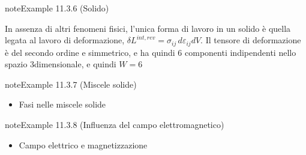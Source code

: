\documentclass[letterpaper,10pt,italian]{jupyterBook}
\begin{document}
\label{ch/thermodynamics/principles-gibbs-phase-rule:example-8}
\begin{sphinxadmonition}{note}{Example 11.3.6 (Solido)}



\sphinxAtStartPar
In assenza di altri fenomeni fisici, l’unica forma di lavoro in un solido è quella legata al lavoro di deformazione, \(\delta L^{int,rev} = \sigma_{ij} \, d \varepsilon_{ij} dV\). Il tensore di deformazione è del secondo ordine e simmetrico, e ha quindi 6 componenti indipendenti nello spazio 3\sphinxhyphen{}dimensionale, e quindi \(W=6\)
\end{sphinxadmonition}
\label{ch/thermodynamics/principles-gibbs-phase-rule:example-9}
\begin{sphinxadmonition}{note}{Example 11.3.7 (Miscele solide)}


\begin{itemize}
\item {} 
\sphinxAtStartPar
Fasi nelle miscele solide 

\end{itemize}
\end{sphinxadmonition}
\label{ch/thermodynamics/principles-gibbs-phase-rule:example-10}
\begin{sphinxadmonition}{note}{Example 11.3.8 (Influenza del campo elettromagnetico)}


\begin{itemize}
\item {} 
\sphinxAtStartPar
Campo elettrico e magnetizzazione 

\end{itemize}
\end{sphinxadmonition}
\end{document}
